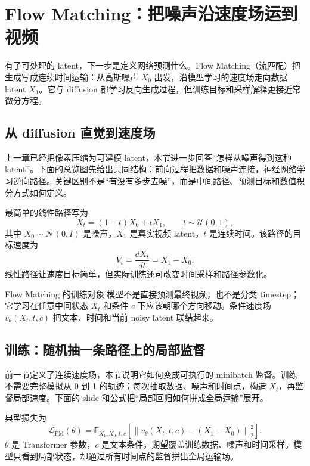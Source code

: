 \section{Flow Matching：把噪声沿速度场运到视频}

有了可处理的 latent，下一步是定义网络预测什么。Flow Matching（流匹配）把生成写成连续时间运输：从高斯噪声 $X_0$ 出发，沿模型学习的速度场走向数据 latent $X_1$。它与 diffusion 都学习反向生成过程，但训练目标和采样解释更接近常微分方程。

\subsection{从 diffusion 直觉到速度场}

上一章已经把像素压缩为可建模 latent，本节进一步回答“怎样从噪声得到这种 latent”。下面的总览图先给出共同结构：前向过程把数据和噪声连接，神经网络学习逆向路径。关键区别不是“有没有多步去噪”，而是中间路径、预测目标和数值积分方式如何定义。


最简单的线性路径写为
\[
X_t=(1-t)X_0+tX_1,
\qquad t\sim\mathcal U(0,1),
\]
其中 $X_0\sim\mathcal N(0,I)$ 是噪声，$X_1$ 是真实视频 latent，$t$ 是连续时间。该路径的目标速度为
\[
V_t=\frac{dX_t}{dt}=X_1-X_0.
\]
线性路径让速度目标简单，但实际训练还可改变时间采样和路径参数化。

\begin{importantbox}{Flow Matching 的训练对象}
模型不是直接预测最终视频，也不是分类 timestep；它学习在任意中间状态 $X_t$ 和条件 $c$ 下应该朝哪个方向移动。条件速度场 $v_\theta(X_t,t,c)$ 把文本、时间和当前 noisy latent 联结起来。
\end{importantbox}

\subsection{训练：随机抽一条路径上的局部监督}

前一节定义了连续速度场，本节说明它如何变成可执行的 minibatch 监督。训练不需要完整模拟从 0 到 1 的轨迹；每次抽取数据、噪声和时间点，构造 $X_t$，再监督局部速度。下面的 slide 和公式把“局部回归如何拼成全局运输”展开。


典型损失为
\[
\mathcal L_{\mathrm{FM}}(\theta)
=\mathbb E_{X_1,X_0,t,c}
\left[\left\|v_\theta(X_t,t,c)-(X_1-X_0)\right\|_2^2\right].
\]
$\theta$ 是 Transformer 参数，$c$ 是文本条件，期望覆盖训练数据、噪声和时间采样。模型只看到局部状态，却通过所有时间点的监督拼出全局运输场。

